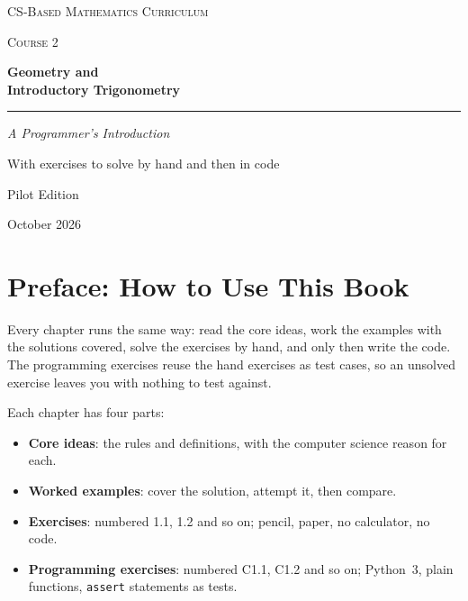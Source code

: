 \documentclass[11pt,letterpaper,openany]{book}
\newcounter{example}[chapter]
\begin{document}
\frontmatter

\begin{titlepage}
\centering
\vspace*{1.6in}
{\color{slate}\scshape\large CS-Based Mathematics Curriculum\par}
{\color{slate}\scshape\large Course 2\par}
\vspace{0.6in}
{\color{navy}\bfseries\fontsize{40}{46}\selectfont Geometry and\\[4pt] Introductory Trigonometry\par}
\vspace{0.3in}
{\color{navy}\rule{0.6\textwidth}{1.2pt}}\par
\vspace{0.3in}
{\Large\itshape A Programmer's Introduction\par}
\vspace{0.25in}
{\large With exercises to solve by hand and then in code\par}
\vfill
{\large Pilot Edition\par}
{\large October 2026\par}
\vspace{0.6in}
\end{titlepage}

\pagestyle{plain}

\chapter*{Preface: How to Use This Book}

Every chapter runs the same way: read the core ideas, work the examples with the solutions covered, solve the exercises by hand, and only then write the code. The programming exercises reuse the hand exercises as test cases, so an unsolved exercise leaves you with nothing to test against.

Each chapter has four parts:

\begin{itemize}
\item \textbf{Core ideas}: the rules and definitions, with the computer science reason for each.
\item \textbf{Worked examples}: cover the solution, attempt it, then compare.
\item \textbf{Exercises}: numbered 1.1, 1.2 and so on; pencil, paper, no calculator, no code.
\item \textbf{Programming exercises}: numbered C1.1, C1.2 and so on; Python~3, plain functions, \lstinline!assert! statements as tests.
\end{itemize}
\end{document}
